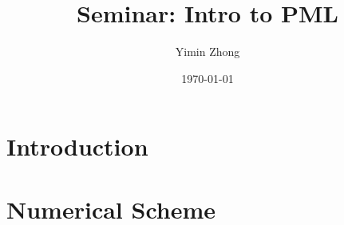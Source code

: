 \documentclass[12pt]{note}
\title{Seminar: Intro to PML}
\author{Yimin Zhong}
\date{\today}
\begin{document}
\maketitle
\section{Introduction}
\section{Numerical Scheme}
\end{document}
